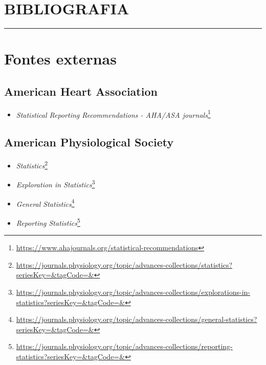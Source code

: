\documentclass[
]{book}
\providecommand{\tightlist}{%
  \setlength{\itemsep}{0pt}\setlength{\parskip}{0pt}}
\renewcommand{\href}[2]{#2\footnote{\url{#1}}}
\begin{document}

\hypertarget{bibliografia}{%
\chapter*{\texorpdfstring{\textbf{BIBLIOGRAFIA}}{BIBLIOGRAFIA}}\label{bibliografia}}

\markboth{}{}
\par\noindent\rule{\textwidth}{0.05in}

\hypertarget{fontes-externas}{%
\chapter*{\texorpdfstring{\textbf{Fontes externas}}{Fontes externas}}\label{fontes-externas}}

\hypertarget{american-heart-association}{%
\section*{American Heart Association}\label{american-heart-association}}

\begin{itemize}
\tightlist
\item
  \href{https://www.ahajournals.org/statistical-recommendations}{\emph{Statistical Reporting Recommendations - AHA/ASA journals}}
\end{itemize}

\hypertarget{american-physiological-society}{%
\section*{American Physiological Society}\label{american-physiological-society}}

\begin{itemize}
\item
  \href{https://journals.physiology.org/topic/advances-collections/statistics?seriesKey=\&tagCode=\&}{\emph{Statistics}}
\item
  \href{https://journals.physiology.org/topic/advances-collections/explorations-in-statistics?seriesKey=\&tagCode=\&}{\emph{Exploration in Statistics}}
\item
  \href{https://journals.physiology.org/topic/advances-collections/general-statistics?seriesKey=\&tagCode=\&}{\emph{General Statistics}}
\item
  \href{https://journals.physiology.org/topic/advances-collections/reporting-statistics?seriesKey=\&tagCode=\&}{\emph{Reporting Statistics}}
\end{itemize}
\end{document}

